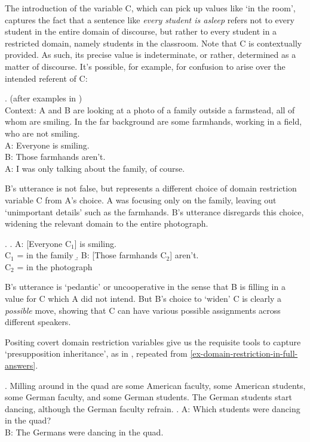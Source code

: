 \documentclass[doublespace]{umthesis}
\begin{document}
The introduction of the variable C, which can pick up values like `in the room', captures the fact that a sentence like {\it every student is asleep} refers not to every student in the entire domain of discourse, but rather to every student in a restricted domain, namely students in the classroom.
Note that C is contextually provided.
As such, its precise value is indeterminate, or rather, determined as a matter of discourse.
It's possible, for example, for confusion to arise over the intended referent of C:

\ex. 	(after examples in \cite{Kr04DomRest})\\
	Context: A and B are looking at a photo of a family outside a farmstead, all of whom are smiling. In the far background are some farmhands, working in a field, who are not smiling.\\
	A: Everyone is smiling.\\
	B: Those farmhands aren't.\\
	A: I was only talking about the family, of course.
	
B's utterance is not false, but represents a different choice of domain restriction variable C from A's choice.
A was focusing only on the family, leaving out `unimportant details' such as the farmhands.
B's utterance disregards this choice, widening the relevant domain to the entire photograph.

\ex. 	\a. A: [Everyone C$_1$] is smiling.\\
		C$_1$ = in the family
	\b.	B: [Those farmhands C$_2$] aren't.\\
		C$_2$ = in the photograph
		
B's utterance is `pedantic' or uncooperative in the sense that B is filling in a value for C which A did not intend.
But B's choice to `widen' C is clearly a \emph{possible} move, showing that C can have various possible assignments across different speakers.

Positing covert domain restriction variables give us the requisite tools to capture `presupposition inheritance', as in \Next, repeated from \ref{ex-domain-restriction-in-full-answers}.

\ex. 	Milling around in the quad are some American faculty, some American students, some German faculty, and some German students.
The German students start dancing, although the German faculty refrain.
	\a. A: Which students were dancing in the quad?\\
	B: The Germans were dancing in the quad.
\end{document}
